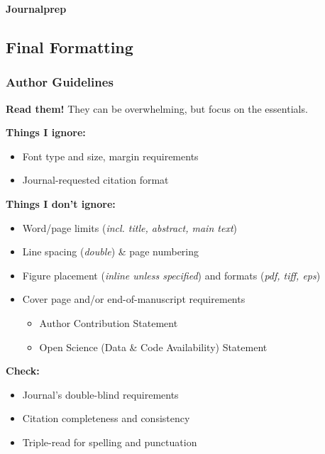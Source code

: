 \documentclass{beamer}
\begin{document}
\begin{frame}
  \centering
  \vfill
  {\Large\bfseries Journalprep}
  \vfill
\end{frame}




\subsection{Final Formatting}
\footnotesize
\begin{frame}
  \frametitle{Author Guidelines}

    \alert{\textbf{Read them!}}
    They can be overwhelming, but focus on the essentials.

    \medspace

    \textbf{Things I ignore:}
    \begin{itemize}
      \item Font type and size, margin requirements
      \item Journal-requested citation format
    \end{itemize}

    \textbf{Things I don't ignore:}
    \begin{itemize}
      \item Word/page limits (\textit{incl. title, abstract, main text})
      \item Line spacing (\textit{double}) \& page numbering
      \item Figure placement (\textit{inline unless specified}) and formats (\textit{pdf, tiff, eps})
    \item Cover page and/or end-of-manuscript requirements
    \begin{itemize}
      \scriptsize \item Author Contribution Statement
      \item Open Science (Data \& Code Availability) Statement
    \end{itemize}
    \end{itemize}

    \textbf{Check:}
    \begin{itemize}
    \item Journal's double-blind requirements
    \item Citation completeness and consistency
    \item Triple-read for spelling and punctuation
    \end{itemize}
\end{frame}
\end{document}
